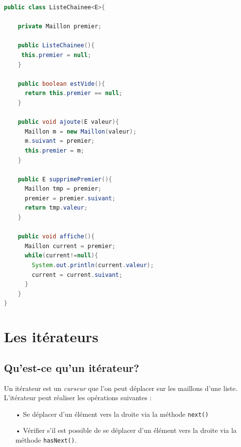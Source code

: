 \documentclass[iutinfo,a4paper,nocorrections,10pt]{ustl-tdtp}
\begin{document}

\begin{correction}
{\color{red}
\begin{lstlisting}[language=Java]
public class ListeChainee<E>{

    private Maillon premier;
    
    public ListeChainee(){
	 this.premier = null;
    } 
    
    public boolean estVide(){
	  return this.premier == null;
    }
    
    public void ajoute(E valeur){
	  Maillon m = new Maillon(valeur);
	  m.suivant = premier;
	  this.premier = m; 
    }
    
    public E supprimePremier(){
	  Maillon tmp = premier;
	  premier = premier.suivant;
	  return tmp.valeur;
    }
    
    public void affiche(){
	  Maillon current = premier;
	  while(current!=null){
	    System.out.println(current.valeur);
	    current = current.suivant;
	  }
    } 
}
\end{lstlisting}
}

\end{correction}

\section{Les itérateurs}
\subsection{Qu'est-ce qu'un itérateur?}
Un itérateur est un \textit{curseur} que l'on peut déplacer sur les maillons d'une liste. L'itérateur peut réaliser les opérations suivantes :

\begin{itemize}
\item[•] Se déplacer d'un élément vers la droite via la méthode \texttt{next()} 
\item[•] Vérifier s'il est possible de se déplacer d'un élément vers la droite via la méthode \texttt{hasNext()}. 
\end{itemize}

~
\end{document}
